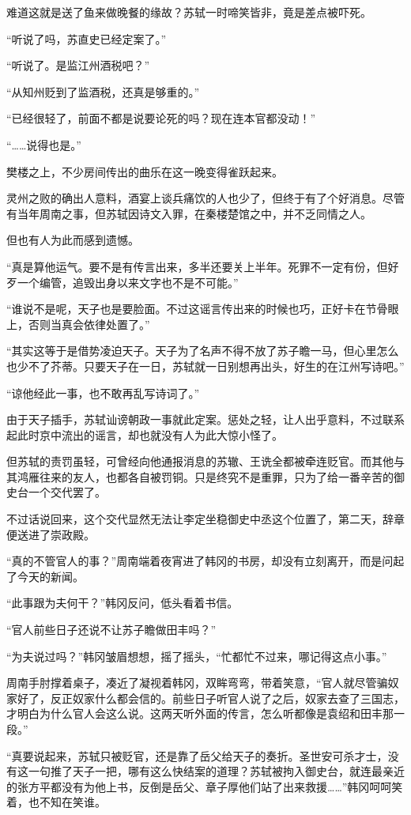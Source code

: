 难道这就是送了鱼来做晚餐的缘故？苏轼一时啼笑皆非，竟是差点被吓死。

“听说了吗，苏直史已经定案了。”

“听说了。是监江州酒税吧？”

“从知州贬到了监酒税，还真是够重的。”

“已经很轻了，前面不都是说要论死的吗？现在连本官都没动！”

“……说得也是。”

樊楼之上，不少房间传出的曲乐在这一晚变得雀跃起来。

灵州之败的确出人意料，酒宴上谈兵痛饮的人也少了，但终于有了个好消息。尽管有当年周南之事，但苏轼因诗文入罪，在秦楼楚馆之中，并不乏同情之人。

但也有人为此而感到遗憾。

“真是算他运气。要不是有传言出来，多半还要关上半年。死罪不一定有份，但好歹一个编管，追毁出身以来文字也不是不可能。”

“谁说不是呢，天子也是要脸面。不过这谣言传出来的时候也巧，正好卡在节骨眼上，否则当真会依律处置了。”

“其实这等于是借势凌迫天子。天子为了名声不得不放了苏子瞻一马，但心里怎么也少不了芥蒂。只要天子在一日，苏轼就一日别想再出头，好生的在江州写诗吧。”

“谅他经此一事，也不敢再乱写诗词了。”

由于天子插手，苏轼讪谤朝政一事就此定案。惩处之轻，让人出乎意料，不过联系起此时京中流出的谣言，却也就没有人为此大惊小怪了。

但苏轼的责罚虽轻，可曾经向他通报消息的苏辙、王诜全都被牵连贬官。而其他与其鸿雁往来的友人，也都各自被罚铜。只是终究不是重罪，只为了给一番辛苦的御史台一个交代罢了。

不过话说回来，这个交代显然无法让李定坐稳御史中丞这个位置了，第二天，辞章便送进了崇政殿。

“真的不管官人的事？”周南端着夜宵进了韩冈的书房，却没有立刻离开，而是问起了今天的新闻。

“此事跟为夫何干？”韩冈反问，低头看着书信。

“官人前些日子还说不让苏子瞻做田丰吗？”

“为夫说过吗？”韩冈皱眉想想，摇了摇头，“忙都忙不过来，哪记得这点小事。”

周南手肘撑着桌子，凑近了凝视着韩冈，双眸弯弯，带着笑意，“官人就尽管骗奴家好了，反正奴家什么都会信的。前些日子听官人说了之后，奴家去查了三国志，才明白为什么官人会这么说。这两天听外面的传言，怎么听都像是袁绍和田丰那一段。”

“真要说起来，苏轼只被贬官，还是靠了岳父给天子的奏折。圣世安可杀才士，没有这一句推了天子一把，哪有这么快结案的道理？苏轼被拘入御史台，就连最亲近的张方平都没有为他上书，反倒是岳父、章子厚他们站了出来救援……”韩冈呵呵笑着，也不知在笑谁。

